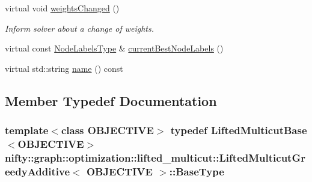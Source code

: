 \begin{DoxyCompactItemize}
\item 
virtual void \hyperlink{classnifty_1_1graph_1_1optimization_1_1lifted__multicut_1_1LiftedMulticutGreedyAdditive_a8a4f4e4800f4b08eadc05c7199faccef}{weights\+Changed} ()
\begin{DoxyCompactList}\small\item\em Inform solver about a change of weights. \end{DoxyCompactList}\item 
virtual const \hyperlink{classnifty_1_1graph_1_1optimization_1_1lifted__multicut_1_1LiftedMulticutGreedyAdditive_a91a2db6b526ecf8fe9ad4478c068cbef}{Node\+Labels\+Type} \& \hyperlink{classnifty_1_1graph_1_1optimization_1_1lifted__multicut_1_1LiftedMulticutGreedyAdditive_a141926ed5f532f6fd1488cb083d966a7}{current\+Best\+Node\+Labels} ()
\item 
virtual std\+::string \hyperlink{classnifty_1_1graph_1_1optimization_1_1lifted__multicut_1_1LiftedMulticutGreedyAdditive_a25a6d65f54026da4710a8d5a4e6b16c1}{name} () const 
\end{DoxyCompactItemize}


\subsection{Member Typedef Documentation}
\hypertarget{classnifty_1_1graph_1_1optimization_1_1lifted__multicut_1_1LiftedMulticutGreedyAdditive_a6829b614366e47118c6cb428ba5496e9}{}
\subsubsection[{Base\+Type}]{\setlength{\rightskip}{0pt plus 5cm}template$<$class O\+B\+J\+E\+C\+T\+I\+V\+E$>$ typedef {\bf Lifted\+Multicut\+Base}$<$O\+B\+J\+E\+C\+T\+I\+V\+E$>$ {\bf nifty\+::graph\+::optimization\+::lifted\+\_\+multicut\+::\+Lifted\+Multicut\+Greedy\+Additive}$<$ O\+B\+J\+E\+C\+T\+I\+V\+E $>$\+::{\bf Base\+Type}}\label{classnifty_1_1graph_1_1optimization_1_1lifted__multicut_1_1LiftedMulticutGreedyAdditive_a6829b614366e47118c6cb428ba5496e9}
\hypertarget{classnifty_1_1graph_1_1optimization_1_1lifted__multicut_1_1LiftedMulticutGreedyAdditive_abf11c8446b89d894ab323829ffdd9860}{}
